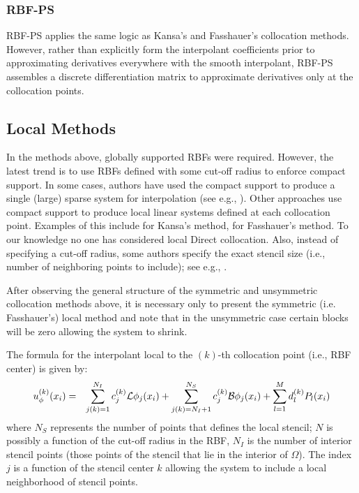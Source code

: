 \documentclass{report}
\begin{document}
{%
\subsubsection{RBF-PS}

 RBF-PS applies the same logic as Kansa's and Fasshauer's collocation methods. However, rather than explicitly form the interpolant coefficients prior to approximating derivatives everywhere with the smooth interpolant, RBF-PS assembles a discrete differentiation matrix to approximate derivatives only at the collocation points. 

\subsection{Local Methods}
In the methods above, globally supported RBFs were required. However, the latest trend is to use RBFs defined with some cut-off radius to enforce compact support. In some cases, authors have used the compact support to produce a single (large) sparse system for interpolation (see e.g., \cite{Wang2002, Liu2005, Correa2007, Yang2008, Lin2009}). Other approaches use compact support to produce local linear systems defined at each collocation point. Examples of this include \cite{Sarler2006, Vertnik2006} for Kansa's method, \cite{Stevens2008a, Stevens2009a, Stevens2009b} for Fasshauer's method. To our knowledge no one has considered local Direct collocation.  Also, instead of specifying a cut-off radius, some authors specify the exact stencil size (i.e., number of neighboring points to include); see e.g., \cite{Divo2007, Stevens2009b}. 

After observing the general structure of the symmetric and unsymmetric collocation methods above, it is necessary only to present the symmetric (i.e. Fasshauer's) local method and note that in the unsymmetric case certain blocks will be zero allowing the system to shrink. 

The formula for the interpolant local to the $(k)$-th collocation point (i.e., RBF center) is given by: 
\begin{eqnarray}
u^{(k)}_\phi(x_i) & = & \sum_{j(k)=1}^{N_{I}}  c_j^{(k)} \mathcal{L}\phi_j(x_i) + \sum_{j(k)=N_{I} + 1}^{N_{S}} c^{(k)}_j\mathcal{B}\phi_j(x_i) + \sum_{l=1}^{M}d^{(k)}_l P_l(x_i)
\label{eqn:fasshauer_local_approx}
\end{eqnarray}
where $N_{S}$ represents the number of points that defines the local stencil; $N$ is possibly a function of the cut-off radius in the RBF, $N_{I}$ is the number of interior stencil points (those points of the stencil that lie in the interior of $\Omega$). The index $j$ is a function of the stencil center $k$ allowing the system to include a local neighborhood of stencil points.

}
\end{document}
